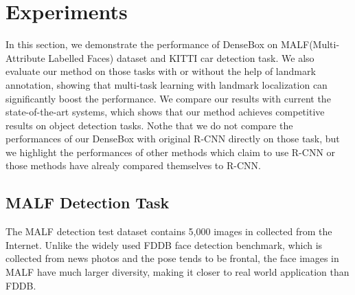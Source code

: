 
 
\section{Experiments}

In this section, we demonstrate the performance of DenseBox on MALF(Multi-Attribute Labelled Faces) dataset\cite{faceevaluation15}  and KITTI\cite{Geiger2012CVPR} car detection task. We also evaluate our method on those tasks with or without the help of landmark annotation, showing that multi-task learning with landmark localization can significantly boost the performance. We compare our results with current the state-of-the-art systems, which shows that our method achieves competitive results on object detection tasks.  Nothe that we do not compare the performances of our DenseBox with original R-CNN directly on those task, but we highlight the performances of other methods which claim to use R-CNN or those methods have alrealy compared themselves to R-CNN. 

\subsection{ MALF  Detection Task}
The MALF detection test dataset contains 5,000 images in collected from the Internet. Unlike the widely used FDDB\cite{jain2010fddb} face detection benchmark, which is collected from news photos and the pose tends to be frontal, the face images in MALF have much larger diversity, making it closer to real world application than FDDB. 

